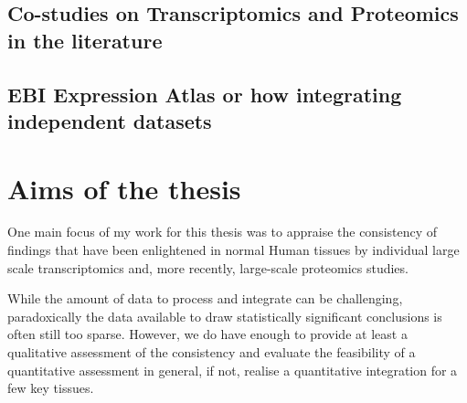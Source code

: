 \begin{comment}
\subsection{Reproducibility issues}
        \begin{itemize}
            \item{Different samples}
            \item{Technology: wet lab but also software: Rupgrade, ....}
            \item{missing meta-data}
        \end{itemize}
    \subsection{Main concerns}
        \subsubsection{Detection}
        \subsubsection{Quantification}
    \subsection{Consistency through biological layers}
\end{comment}


\subsection{Co-studies on Transcriptomics and Proteomics in the literature}
\subsection{EBI Expression Atlas or how integrating independent datasets }


\section{Aims of the thesis}

One main focus of my work for this thesis was to appraise the
consistency of findings that have been enlightened in normal Human tissues by
individual large scale transcriptomics and, more recently, large-scale
proteomics studies.

While the amount of data to process and integrate can be challenging,
paradoxically the data available to draw statistically significant conclusions
is often still too sparse. However, we do have enough to provide at least a
qualitative assessment of the consistency and evaluate the feasibility of a
quantitative assessment in general, if not, realise a quantitative integration
for a few key tissues.

